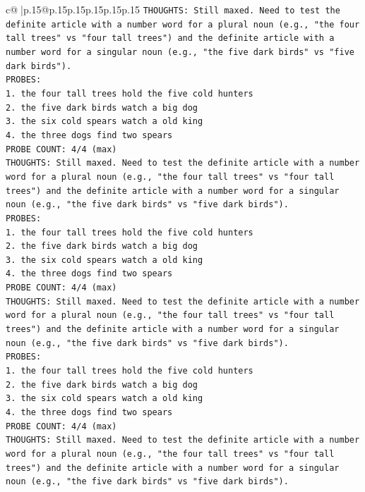 \documentclass{article}
\begin{document}
{\begin{supertabular}{c@{$\;$}|p{.15\linewidth}@{}p{.15\linewidth}p{.15\linewidth}p{.15\linewidth}p{.15\linewidth}p{.15\linewidth}}
{{{\texttt{THOUGHTS: Still maxed. Need to test the definite article with a number word for a plural noun (e.g., "the four tall trees" vs "four tall trees") and the definite article with a number word for a singular noun (e.g., "the five dark birds" vs "five dark birds").} \\
\texttt{PROBES:} \\
\texttt{1. the four tall trees hold the five cold hunters} \\
\texttt{2. the five dark birds watch a big dog} \\
\texttt{3. the six cold spears watch a old king} \\
\texttt{4. the three dogs find two spears} \\
\texttt{PROBE COUNT: 4/4 (max)} \\
\texttt{THOUGHTS: Still maxed. Need to test the definite article with a number word for a plural noun (e.g., "the four tall trees" vs "four tall trees") and the definite article with a number word for a singular noun (e.g., "the five dark birds" vs "five dark birds").} \\
\texttt{PROBES:} \\
\texttt{1. the four tall trees hold the five cold hunters} \\
\texttt{2. the five dark birds watch a big dog} \\
\texttt{3. the six cold spears watch a old king} \\
\texttt{4. the three dogs find two spears} \\
\texttt{PROBE COUNT: 4/4 (max)} \\
\texttt{THOUGHTS: Still maxed. Need to test the definite article with a number word for a plural noun (e.g., "the four tall trees" vs "four tall trees") and the definite article with a number word for a singular noun (e.g., "the five dark birds" vs "five dark birds").} \\
\texttt{PROBES:} \\
\texttt{1. the four tall trees hold the five cold hunters} \\
\texttt{2. the five dark birds watch a big dog} \\
\texttt{3. the six cold spears watch a old king} \\
\texttt{4. the three dogs find two spears} \\
\texttt{PROBE COUNT: 4/4 (max)} \\
\texttt{THOUGHTS: Still maxed. Need to test the definite article with a number word for a plural noun (e.g., "the four tall trees" vs "four tall trees") and the definite article with a number word for a singular noun (e.g., "the five dark birds" vs "five dark birds").} \\
}}}
\end{supertabular}}
\end{document}
